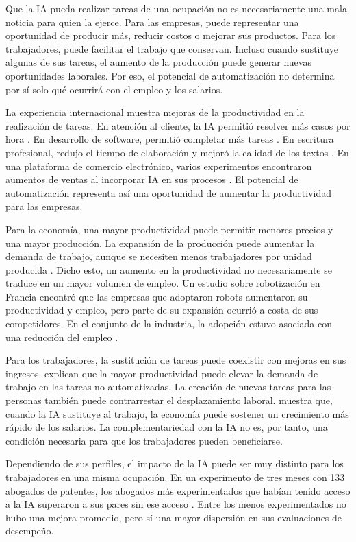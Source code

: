 \documentclass[12pt, a4paper]{article}
\begin{document}
Que la IA pueda realizar tareas de una ocupación no es necesariamente una mala noticia para quien la ejerce. Para las empresas, puede representar una oportunidad de producir más, reducir costos o mejorar sus productos. Para los trabajadores, puede facilitar el trabajo que conservan. Incluso cuando sustituye algunas de sus tareas, el aumento de la producción puede generar nuevas oportunidades laborales. Por eso, el potencial de automatización no determina por sí solo qué ocurrirá con el empleo y los salarios.

La experiencia internacional muestra mejoras de la productividad en la realización de tareas. En atención al cliente, la IA permitió resolver más casos por hora \citep{brynjolfsson2025}. En desarrollo de software, permitió completar más tareas \citep{cui2026}. En escritura profesional, redujo el tiempo de elaboración y mejoró la calidad de los textos \citep{noy2023}. En una plataforma de comercio electrónico, varios experimentos encontraron aumentos de ventas al incorporar IA en sus procesos \citep{fang2026}. El potencial de automatización representa así una oportunidad de aumentar la productividad para las empresas.

Para la economía, una mayor productividad puede permitir menores precios y una mayor producción. La expansión de la producción puede aumentar la demanda de trabajo, aunque se necesiten menos trabajadores por unidad producida \citep{acemoglu2019}. Dicho esto, un aumento en la productividad no necesariamente se traduce en un mayor volumen de empleo. Un estudio sobre robotización en Francia encontró que las empresas que adoptaron robots aumentaron su productividad y empleo, pero parte de su expansión ocurrió a costa de sus competidores. En el conjunto de la industria, la adopción estuvo asociada con una reducción del empleo \citep{acemoglu2020robots}.

Para los trabajadores, la sustitución de tareas puede coexistir con mejoras en sus ingresos. \citet{acemoglu2019} explican que la mayor productividad puede elevar la demanda de trabajo en las tareas no automatizadas. La creación de nuevas tareas para las personas también puede contrarrestar el desplazamiento laboral.  \citet{pardo2026} muestra que, cuando la IA sustituye al trabajo, la economía puede sostener un crecimiento más rápido de los salarios. La complementariedad con la IA no es, por tanto, una condición necesaria para que los trabajadores pueden beneficiarse.

Dependiendo de sus perfiles, el impacto de la IA puede ser muy distinto para los trabajadores en una misma ocupación. En un experimento de tres meses con 133 abogados de patentes, los abogados más experimentados que habían tenido acceso a la IA superaron a sus pares sin ese acceso \citep{autor2026}. Entre los menos experimentados no hubo una mejora promedio, pero sí una mayor dispersión en sus evaluaciones de desempeño. 
\end{document}
